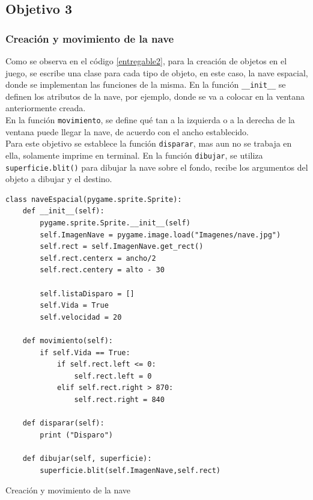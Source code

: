 \documentclass[12pt,letterpaper]{article}
\begin{document}
\subsection{Objetivo 3}
\subsubsection{Creación y movimiento de la nave} \label{objetivo3}
Como se observa en el código \ref{entregable2}, para la creación de objetos en el juego, se escribe una clase para cada tipo de objeto, en este caso, la nave espacial, donde se implementan las funciones de la misma. En la función \texttt{\_\_init\_\_} se definen los atributos de la nave, por ejemplo, donde se va a colocar en la ventana anteriormente creada.\vspace{5mm}\\
\indent En la función \texttt{movimiento}, se define qué tan a la izquierda o a la derecha de la ventana puede llegar la nave, de acuerdo con el ancho establecido.\vspace{5mm}\\
\indent Para este objetivo se establece la función \texttt{disparar}, mas aun no se trabaja en ella, solamente imprime en terminal.
En la función \texttt{dibujar}, se utiliza \texttt{superficie.blit()} para dibujar la nave sobre el fondo, recibe los argumentos del objeto a dibujar y el destino. 
\begin{listing}[H]
\begin{verbatim}
class naveEspacial(pygame.sprite.Sprite):
    def __init__(self):
        pygame.sprite.Sprite.__init__(self)
        self.ImagenNave = pygame.image.load("Imagenes/nave.jpg")
        self.rect = self.ImagenNave.get_rect()
        self.rect.centerx = ancho/2
        self.rect.centery = alto - 30

        self.listaDisparo = []
        self.Vida = True
        self.velocidad = 20
        
    def movimiento(self):
        if self.Vida == True:
            if self.rect.left <= 0:
                self.rect.left = 0
            elif self.rect.right > 870:
                self.rect.right = 840
                
    def disparar(self):
        print ("Disparo")

    def dibujar(self, superficie):
        superficie.blit(self.ImagenNave,self.rect)    

\end{verbatim}
\caption{Creación y movimiento de la nave}
\label{entregable2}
\end{listing}
\end{document}
